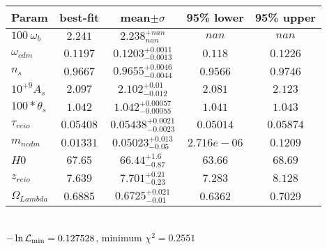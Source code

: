 \begin{tabular}{|l|c|c|c|c|} 
 \hline 
Param & best-fit & mean$\pm\sigma$ & 95\% lower & 95\% upper \\ \hline 
$100~\omega{}_{b }$ &$2.241$ & $2.238_{nan}^{+nan}$ & $nan$ & $nan$ \\ 
$\omega{}_{cdm }$ &$0.1197$ & $0.1203_{-0.0013}^{+0.0011}$ & $0.118$ & $0.1226$ \\ 
$n_{s }$ &$0.9667$ & $0.9655_{-0.0044}^{+0.0046}$ & $0.9566$ & $0.9746$ \\ 
$10^{+9}A_{s }$ &$2.097$ & $2.102_{-0.012}^{+0.01}$ & $2.081$ & $2.123$ \\ 
$100*\theta{}_{s }$ &$1.042$ & $1.042_{-0.00055}^{+0.00057}$ & $1.041$ & $1.043$ \\ 
$\tau{}_{reio }$ &$0.05408$ & $0.05438_{-0.0023}^{+0.0021}$ & $0.05014$ & $0.05874$ \\ 
$m_{ncdm }$ &$0.01331$ & $0.05023_{-0.05}^{+0.013}$ & $2.716e-06$ & $0.1209$ \\ 
$H0$ &$67.65$ & $66.44_{-0.87}^{+1.6}$ & $63.66$ & $68.69$ \\ 
$z_{reio }$ &$7.639$ & $7.701_{-0.23}^{+0.21}$ & $7.283$ & $8.128$ \\ 
$\Omega{}_{Lambda }$ &$0.6885$ & $0.6725_{-0.01}^{+0.021}$ & $0.6362$ & $0.7029$ \\ 
\hline 
 \end{tabular} \\ 
$-\ln{\cal L}_\mathrm{min} =0.127528$, minimum $\chi^2=0.2551$ \\ 
